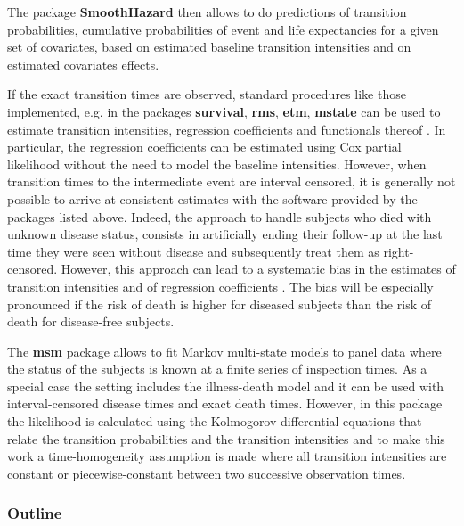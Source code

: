 \documentclass{article}
\newcommand{\pkg}[1]{{\bf #1}}
\begin{document}
The package \pkg{SmoothHazard} then allows to do predictions of
transition probabilities, cumulative probabilities of event and 
life expectancies for a given set of covariates, 
based on estimated baseline transition intensities and on estimated 
covariates effects. 

If the exact transition times are observed, standard procedures like
those implemented, e.g. in the packages \pkg{survival}, \pkg{rms},
\pkg{etm}, \pkg{mstate} can be used to estimate transition
intensities, regression coefficients and functionals thereof
\citep[see][]{deWreede_Fiocco_Putter_2010, beyersmann2011competing}.
In particular, the regression coefficients can be estimated using Cox
partial likelihood \citep{coxpartial} without the need to model the
baseline intensities. However, when transition times to the
intermediate event are interval censored, it is generally not possible
to arrive at consistent estimates with the software provided by the
packages listed above. 
Indeed, the approach to handle subjects who died with unknown disease 
status, consists in artificially ending their follow-up 
at the last time they were seen without disease and subsequently 
treat them as right-censored. 
However, this approach can lead to a systematic bias in the
estimates of transition intensities and of regression coefficients
\citep{Joly_Commenges_Helmer_Letenneur_2002, Leffondre_2013}. The bias
will be especially pronounced if the risk of death is higher for
diseased subjects than the risk of death for disease-free subjects.

The \pkg{msm} package \citep{Jackson_2010} allows to fit Markov
multi-state models to panel data where the status of the subjects is
known at a finite series of inspection times. As a special case the
setting includes the illness-death model and it can be used with
interval-censored disease times and exact death times. However, in
this package the likelihood is calculated using the Kolmogorov
differential equations that relate the transition probabilities and
the transition intensities and to make this work a time-homogeneity
assumption is made where all transition intensities are constant or
piecewise-constant between two successive observation times.

\subsubsection{Outline}
\label{sec-1-0-1}
\end{document}
